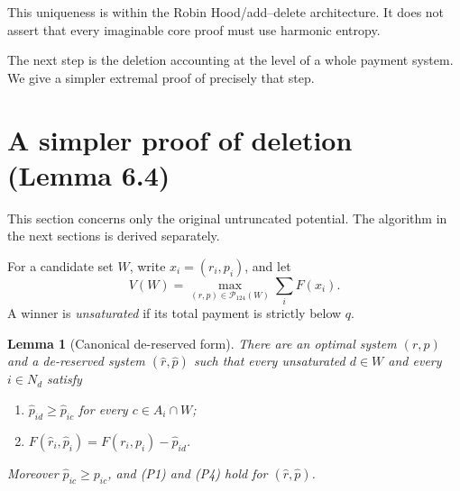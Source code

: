 \documentclass[11pt,a4paper]{article}
\newtheorem{lemma}[theorem]{Lemma}
\theoremstyle{definition}
\theoremstyle{remark}
\newcommand{\calP}{\mathcal P}
\begin{document}
This uniqueness is within the Robin Hood/add--delete architecture. It does not assert that every imaginable core proof must use harmonic entropy.

The next step is the deletion accounting at the level of a whole payment system. We give a simpler extremal proof of precisely that step.
\section{A simpler proof of deletion (Lemma 6.4)}
This section concerns only the original untruncated potential. The algorithm in the next sections is derived separately.

For a candidate set $W$, write $x_i=(r_i,p_i)$, and let
\[
V(W)=\max_{(r,p)\in\calP_{124}(W)}\sum_iF(x_i).
\]
A winner is \emph{unsaturated} if its total payment is strictly below $q$.

\begin{lemma}[Canonical de-reserved form]
There are an optimal system $(r,p)$ and a de-reserved system $(\hat r,\hat p)$ such that every unsaturated $d\in W$ and every $i\in N_d$ satisfy
\begin{enumerate}[label=(\alph*)]
\item $\hat p_{id}\ge\hat p_{ic}$ for every $c\in A_i\cap W$;
\item $F(\hat r_i,\hat p_i)=F(r_i,p_i)-\hat p_{id}$.
\end{enumerate}
Moreover $\hat p_{ic}\ge p_{ic}$, and (P1) and (P4) hold for $(\hat r,\hat p)$.
\end{lemma}
\end{document}
